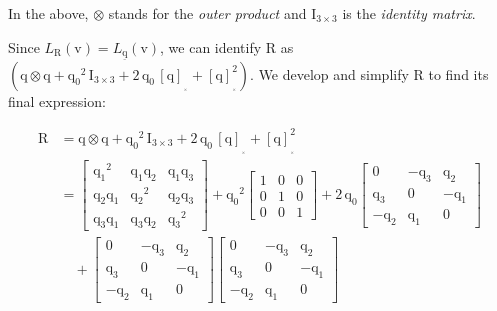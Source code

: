 \noindent In the above, $\otimes$ stands for the \textit{outer product} and $\bm{\mathrm{I}}_{3\times3}$ is the \textit{identity matrix}. 

\noindent Since $L_{\bm{\mathrm{R}}}(\bm{\mathrm{v}}) = L_{\underline{\bm{\mathrm{q}}}}(\bm{\mathrm{v}})$, we can identify $\bm{\mathrm{R}}$ as  $(\bm{\mathrm{q}}\otimes\bm{\mathrm{q}} + {\mathrm{q}_0}^2\,\bm{\mathrm{I}}_{3\times3} + 2\,\mathrm{q}_0\,[\bm{\mathrm{q}}]_{_{_\times}}\!\! + [\bm{\mathrm{q}}]_{_{_\times}}^2)$. We develop and simplify $\bm{\mathrm{R}}$ to find its final expression:

\begin{align*}
	\bm{\mathrm{R}} &= \bm{\mathrm{q}}\otimes\bm{\mathrm{q}} + {\mathrm{q}_0}^2\,\bm{\mathrm{I}}_{3\times3} + 2\,\mathrm{q}_0\,[\bm{\mathrm{q}}]_{_{_\times}}\!\! + [\bm{\mathrm{q}}]_{_{_\times}}^2 \\
	&= \begin{bmatrix}
    	{\mathrm{q}_1}^2 & \mathrm{q}_1\mathrm{q}_2 & \mathrm{q}_1\mathrm{q}_3 \\
    	\mathrm{q}_2\mathrm{q}_1 & {\mathrm{q}_2}^2 & \mathrm{q}_2\mathrm{q}_3 \\
    	\mathrm{q}_3\mathrm{q}_1 & \mathrm{q}_3\mathrm{q}_2 & {\mathrm{q}_3}^2
		\end{bmatrix} 
		+ {\mathrm{q}_0}^2
		\begin{bmatrix}
    	1 & 0 & 0 \\
    	0 & 1 & 0 \\
    	0 & 0 & 1
		\end{bmatrix}
		+
		2\,\mathrm{q}_0 \begin{bmatrix}
    	0 & -\mathrm{q}_3 & \mathrm{q}_2 \\
    	\mathrm{q}_3 & 0 & -\mathrm{q}_1 \\
    	-\mathrm{q}_2 & \mathrm{q}_1 & 0
		\end{bmatrix} \\
		&\quad+
		\begin{bmatrix}
    	0 & -\mathrm{q}_3 & \mathrm{q}_2 \\
    	\mathrm{q}_3 & 0 & -\mathrm{q}_1 \\
    	-\mathrm{q}_2 & \mathrm{q}_1 & 0
		\end{bmatrix}
		\begin{bmatrix}
    	0 & -\mathrm{q}_3 & \mathrm{q}_2 \\
    	\mathrm{q}_3 & 0 & -\mathrm{q}_1 \\
    	-\mathrm{q}_2 & \mathrm{q}_1 & 0
		\end{bmatrix} \\\\

\end{align*}
